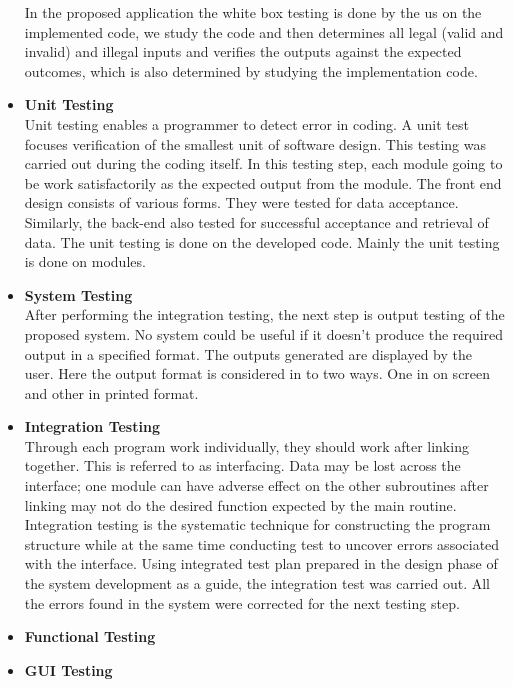 \begin{itemize}
\begin{itemize}
\end{itemize}
In the proposed application the white box testing is done by the us on the implemented code, we study the code and then determines all legal (valid and invalid) and illegal inputs and verifies the outputs against the expected outcomes, which is also determined by studying the implementation code.


\item \textbf{Unit Testing}\\
Unit testing enables a programmer to detect error in coding. A unit test focuses verification of the smallest unit of software design. This testing was carried out during the coding itself. In this testing step, each module going to be work satisfactorily as the expected output from the module.
The front end design consists of various forms. They were tested for data acceptance. Similarly, the back-end also tested for successful acceptance and retrieval of data. The unit testing is done on the developed code. Mainly the unit testing is done on modules.

\item \textbf{System Testing}\\
After performing the integration testing, the next step is output testing of the proposed system. No system could be useful if it doesn't produce the required output in a specified format. The outputs generated are displayed by the user. Here the output format is considered in to two ways. One in on screen and other in printed format.


\item \textbf{Integration Testing}\\
Through each program work individually, they should work after linking together. This is referred to as interfacing. Data may be lost across the interface; one module can have adverse effect on the other subroutines after linking may not do the desired function expected by the main routine. Integration testing is the systematic technique for constructing the program structure while at the same time conducting test to uncover errors associated with the interface. Using integrated test plan prepared in the design phase of the system development as a guide, the integration test was carried out. All the errors found in the system were corrected for the next testing step.
\item \textbf{Functional Testing}

\item \textbf{GUI Testing}

\end{itemize}

